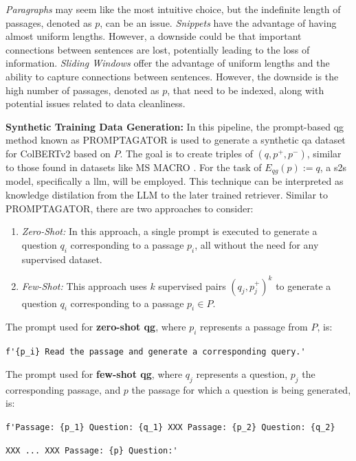 \textit{Paragraphs} may seem like the most intuitive choice, but the indefinite length of passages, denoted as $p$, can be an issue. \textit{Snippets} have the advantage of having almost uniform lengths. However, a downside could be that important connections between sentences are lost, potentially leading to the loss of information. \textit{Sliding Windows} offer the advantage of uniform lengths and the ability to capture connections between sentences. However, the downside is the high number of passages, denoted as $p$, that need to be indexed, along with potential issues related to data cleanliness.

\textbf{Synthetic Training Data Generation:} In this pipeline, the prompt-based \gls{qg} method known as PROMPTAGATOR \cite{dai_promptagator_2022} is used to generate a synthetic \gls{qa} dataset for ColBERTv2 \cite{santhanam_colbertv2_2022} based on $P$. The goal is to create triples of $(q, p^{+}, p^{-})$, similar to those found in datasets like MS MACRO \cite{bajaj_ms_2018}. For the task of $E_{qg}(p) := q$, a \gls{s2s} model, specifically a \gls{llm}, will be employed. This technique can be interpreted as knowledge distilation from the LLM to the later trained retriever. Similar to PROMPTAGATOR, there are two approaches to consider:

\begin{enumerate}
    \item \textit{Zero-Shot:} In this approach, a single prompt is executed to generate a question $q_i$ corresponding to a passage $p_i$, all without the need for any supervised dataset.
    
    \item \textit{Few-Shot:} This approach uses $k$ supervised pairs $(q_j, p^{+}_{j})^{k}$ to generate a question $q_i$ corresponding to a passage $p_i \in P$.
\end{enumerate}

The prompt used for \textbf{zero-shot \gls{qg}}, where $p_i$ represents a passage from $P$, is:

\verb|f'{p_i} Read the passage and generate a corresponding query.'|

The prompt used for \textbf{few-shot \gls{qg}}, where $q_j$ represents a question, $p_j$ the corresponding passage, and $p$ the passage for which a question is being generated, is:

\verb|f'Passage: {p_1} Question: {q_1} XXX Passage: {p_2} Question: {q_2}|

\verb|XXX ... XXX Passage: {p} Question:'|

